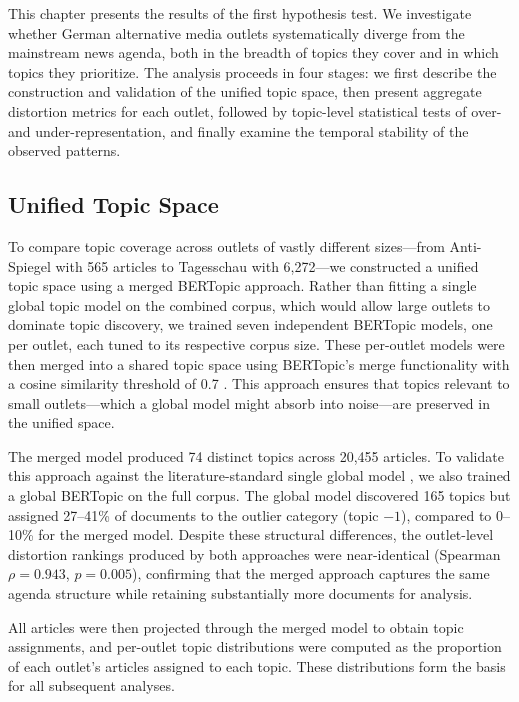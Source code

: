 
This chapter presents the results of the first hypothesis test. We investigate whether German alternative media outlets systematically diverge from the mainstream news agenda, both in the breadth of topics they cover and in which topics they prioritize. The analysis proceeds in four stages: we first describe the construction and validation of the unified topic space, then present aggregate distortion metrics for each outlet, followed by topic-level statistical tests of over- and under-representation, and finally examine the temporal stability of the observed patterns.

\subsection{Unified Topic Space}

To compare topic coverage across outlets of vastly different sizes---from Anti-Spiegel with 565 articles to Tagesschau with 6,272---we constructed a unified topic space using a merged BERTopic approach. Rather than fitting a single global topic model on the combined corpus, which would allow large outlets to dominate topic discovery, we trained seven independent BERTopic models, one per outlet, each tuned to its respective corpus size. These per-outlet models were then merged into a shared topic space using BERTopic's merge functionality with a cosine similarity threshold of 0.7 \parencite{grootendorst2022bertopic}. This approach ensures that topics relevant to small outlets---which a global model might absorb into noise---are preserved in the unified space.

The merged model produced 74 distinct topics across 20,455 articles. To validate this approach against the literature-standard single global model \parencite{jacobi2016quantitative, muller2022rightwing}, we also trained a global BERTopic on the full corpus. The global model discovered 165 topics but assigned 27--41\% of documents to the outlier category (topic $-1$), compared to 0--10\% for the merged model. Despite these structural differences, the outlet-level distortion rankings produced by both approaches were near-identical (Spearman $\rho = 0.943$, $p = 0.005$), confirming that the merged approach captures the same agenda structure while retaining substantially more documents for analysis.

All articles were then projected through the merged model to obtain topic assignments, and per-outlet topic distributions were computed as the proportion of each outlet's articles assigned to each topic. These distributions form the basis for all subsequent analyses.

